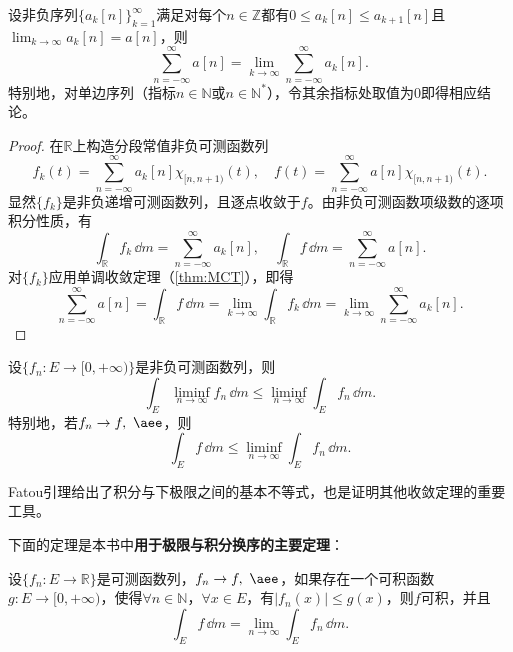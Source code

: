 \begin{corollary}[离散单调收敛定理]\label{cor:discrete_MCT}
    设非负序列$\{a_k[n]\}_{k=1}^{\infty}$满足对每个$n\in\mathbb{Z}$都有$0\leq a_k[n]\leq a_{k+1}[n]$且$\lim_{k\to\infty}a_k[n]=a[n]$，则
    \begin{equation}
        \sum_{n=-\infty}^{\infty}a[n]=\lim_{k\to\infty}\sum_{n=-\infty}^{\infty}a_k[n].
    \end{equation}
    特别地，对单边序列（指标$n\in\mathbb{N}$或$n\in\mathbb{N}^*$），令其余指标处取值为$0$即得相应结论。
\end{corollary}
\begin{proof}
    在$\mathbb{R}$上构造分段常值非负可测函数列
    \begin{equation}
        f_k(t)=\sum_{n=-\infty}^{\infty}a_k[n]\chi_{[n,n+1)}(t),\quad f(t)=\sum_{n=-\infty}^{\infty}a[n]\chi_{[n,n+1)}(t).
    \end{equation}
    显然$\{f_k\}$是非负递增可测函数列，且逐点收敛于$f$。由非负可测函数项级数的逐项积分性质，有
    \begin{equation}
        \int_{\mathbb{R}}f_k\,\dd m=\sum_{n=-\infty}^{\infty}a_k[n],\quad \int_{\mathbb{R}}f\,\dd m=\sum_{n=-\infty}^{\infty}a[n].
    \end{equation}
    对$\{f_k\}$应用单调收敛定理（\cref{thm:MCT}），即得
    \begin{equation}
        \sum_{n=-\infty}^{\infty}a[n]=\int_{\mathbb{R}}f\,\dd m=\lim_{k\to\infty}\int_{\mathbb{R}}f_k\,\dd m=\lim_{k\to\infty}\sum_{n=-\infty}^{\infty}a_k[n].
    \end{equation}
\end{proof}

\begin{theorem}[Fatou引理]
    设$\{f_n:E\to[0,+\infty)\}$是非负可测函数列，则
    \begin{equation}
        \int_{E}\liminf_{n\to\infty}f_n\,\dd m\leq \liminf_{n\to\infty}\int_{E}f_n\,\dd m.
    \end{equation}
    特别地，若$f_n\to f,\ \aee$，则
    \begin{equation}
        \int_{E}f\,\dd m\leq \liminf_{n\to\infty}\int_{E}f_n\,\dd m.
    \end{equation}
\end{theorem}

Fatou引理给出了积分与下极限之间的基本不等式，也是证明其他收敛定理的重要工具。

下面的定理是本书中\textbf{用于极限与积分换序的主要定理}：
\begin{theorem}[Lebesgue控制收敛定理]
    \label{thm:DCT}
    设$\{f_n:E\to\mathbb{R}\}$是可测函数列，$f_n\to f,\ \aee$，如果存在一个可积函数$g:E\to[0,+\infty)$，使得$\forall n\in\mathbb{N}$，$\forall x\in E$，有$|f_n(x)|\leq g(x)$，则$f$可积，并且
    \begin{equation}
        \int_{E}f\,\dd m=\lim_{n\to\infty}\int_{E}f_n\,\dd m.
    \end{equation}
\end{theorem}

